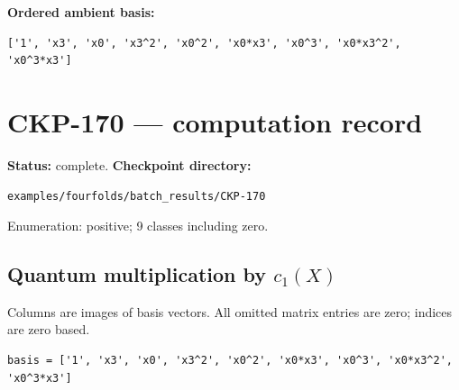 \documentclass[10pt,a4paper]{article}
\begin{document}
\textbf{Ordered ambient basis:}
\begin{lstlisting}
['1', 'x3', 'x0', 'x3^2', 'x0^2', 'x0*x3', 'x0^3', 'x0*x3^2', 'x0^3*x3']
\end{lstlisting}

\clearpage\section*{CKP-170 --- computation record}
\textbf{Status:} complete.
\textbf{Checkpoint directory:}
\begin{lstlisting}
examples/fourfolds/batch_results/CKP-170
\end{lstlisting}

Enumeration: positive; 9 classes including zero.
\subsection*{Quantum multiplication by $c_1(X)$}
Columns are images of basis vectors. All omitted matrix entries are zero; indices are zero based.

\begin{lstlisting}
basis = ['1', 'x3', 'x0', 'x3^2', 'x0^2', 'x0*x3', 'x0^3', 'x0*x3^2', 'x0^3*x3']
\end{lstlisting}
\end{document}
